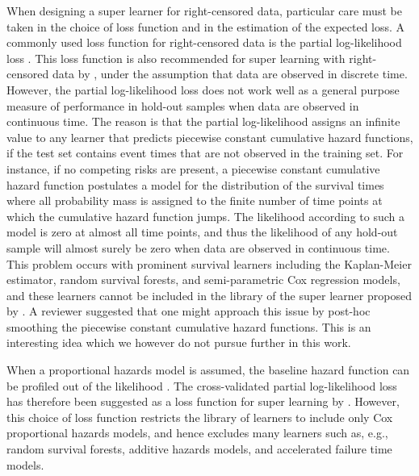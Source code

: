 \documentclass[alpha-refs]{wiley-article}
\newcommand{\1}{\mathbb{1}}
\begin{document}
When designing a super learner for right-censored data, particular
care must be taken in the choice of loss function and in the
estimation of the expected loss. A commonly used loss function for
right-censored data is the partial log-likelihood loss
\citep[e.g.,][]{li2016regularized,yao2017deep,lee2018deephit,katzman2018deepsurv,gensheimer2019scalable,lee2021boosted,kvamme2021continuous}.
This loss function is also recommended for super learning with
right-censored data by \cite{polley2011-sl-cens}, under the assumption
that data are observed in discrete time. However, the partial
log-likelihood loss does not work well as a general purpose measure of
performance in hold-out samples when data are observed in continuous
time. The reason is that the partial log-likelihood assigns an
infinite value to any learner that predicts piecewise constant
cumulative hazard functions, if the test set contains event times that
are not observed in the training set. For instance, if no competing
risks are present, a piecewise constant cumulative hazard function
postulates a model for the distribution of the survival times where
all probability mass is assigned to the finite number of time points
at which the cumulative hazard function jumps. The likelihood
according to such a model is zero at almost all time points, and thus
the likelihood of any hold-out sample will almost surely be zero when
data are observed in continuous time. This problem occurs with
prominent survival learners including the Kaplan-Meier estimator,
random survival forests, and semi-parametric Cox regression models,
and these learners cannot be included in the library of the super
learner proposed by \cite{polley2011-sl-cens}. A reviewer suggested
that one might approach this issue by post-hoc smoothing the piecewise
constant cumulative hazard functions. This is an interesting idea which we
however do not pursue further in this work.

When a proportional hazards model is assumed, the baseline hazard
function can be profiled out of the likelihood
\citep{cox1972regression}. The cross-validated partial log-likelihood
loss \citep{verweij1993cross} has therefore been suggested as a loss
function for super learning by \cite{golmakani2020super}. However,
this choice of loss function restricts the library of learners to
include only Cox proportional hazards models, and hence excludes many
learners such as, e.g., random survival forests, additive hazards
models, and accelerated failure time models.
\end{document}
